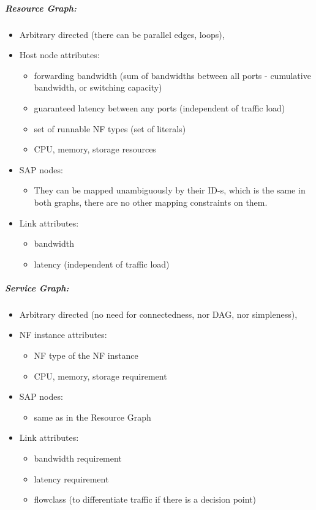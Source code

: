 \documentclass[a4paper,10pt]{scrartcl}
\begin{document}
\subparagraph{Resource Graph:}
\begin{itemize}
\item Arbitrary directed (there can be parallel edges, loops),
\item Host node attributes: 
	\begin{itemize}
	\item forwarding bandwidth (sum of bandwidths between all ports - cumulative bandwidth, or switching capacity)
	\item guaranteed latency between any ports (independent of traffic load)
	\item set of runnable NF types (set of literals)
	\item CPU, memory, storage resources
	\end{itemize}
\item SAP nodes:
	\begin{itemize}
	\item They can be mapped unambiguously by their ID-s, which is the same in both graphs, there are no other mapping constraints on them.
	\end{itemize}
\item Link attributes:
\begin{itemize}
	\item bandwidth
	\item latency (independent of traffic load)
\end{itemize}
\end{itemize}

\subparagraph{Service Graph:}
\begin{itemize}
\item Arbitrary directed (no need for connectedness, nor DAG, nor simpleness),
\item NF instance attributes:
	\begin{itemize}	
	\item NF type of the NF instance
	\item CPU, memory, storage requirement
	\end{itemize}
\item SAP nodes:
	\begin{itemize}	
	\item same as in the Resource Graph
	\end{itemize}
\item Link attributes:
	\begin{itemize}	
	\item bandwidth requirement
	\item latency requirement
	\item flowclass (to differentiate traffic if there is a decision point)
	\end{itemize}
\end{itemize}
\end{document}
